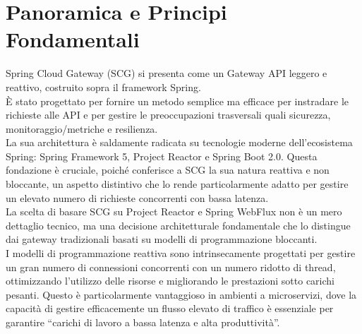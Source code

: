 \section{Panoramica e Principi Fondamentali}

Spring Cloud Gateway (SCG) si presenta come un Gateway API leggero e reattivo, costruito sopra il framework Spring. \\
È stato progettato per fornire un metodo semplice ma efficace per instradare le richieste alle API e per gestire le preoccupazioni trasversali quali sicurezza, monitoraggio/metriche e resilienza. \\
La sua architettura è saldamente radicata su tecnologie moderne dell'ecosistema Spring: Spring Framework 5, Project Reactor e Spring Boot 2.0. 
Questa fondazione è cruciale, poiché conferisce a SCG la sua natura reattiva e non bloccante, un aspetto distintivo che lo rende particolarmente adatto per gestire un elevato numero di richieste concorrenti con bassa latenza. \\

La scelta di basare SCG su Project Reactor e Spring WebFlux non è un mero dettaglio tecnico, ma una decisione architetturale fondamentale che lo distingue dai gateway tradizionali basati su modelli di programmazione bloccanti. \\
I modelli di programmazione reattiva sono intrinsecamente progettati per gestire un gran numero di connessioni concorrenti con un numero ridotto di thread, ottimizzando l'utilizzo delle risorse e migliorando le prestazioni sotto carichi pesanti. 
Questo è particolarmente vantaggioso in ambienti a microservizi, dove la capacità di gestire efficacemente un flusso elevato di traffico è essenziale per garantire \enquote{carichi di lavoro a bassa latenza e alta produttività}.  \\

